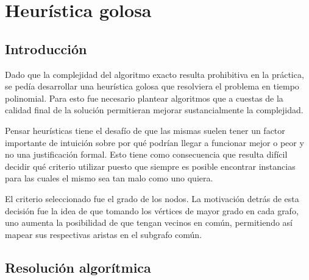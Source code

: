 \section{Heurística golosa}


\subsection{Introducción}

Dado que la complejidad del algoritmo exacto resulta prohibitiva en la práctica,
se pedía desarrollar una heurística golosa que resolviera el problema en tiempo
polinomial. Para esto fue necesario plantear algoritmos que a cuestas de la
calidad final de la solución permitieran mejorar sustancialmente la complejidad.

Pensar heurísticas tiene el desafío de que las mismas suelen tener un factor
importante de intuición sobre por qué podrían llegar a funcionar mejor o peor y
no una justificación formal. Esto tiene como consecuencia que resulta
difícil decidir qué criterio utilizar puesto que siempre es posible
encontrar instancias para las cuales el mismo sea tan malo como uno
quiera.

El criterio seleccionado fue el grado de los nodos. La motivación detrás de esta
decisión fue la idea de que tomando los vértices de mayor grado en cada grafo,
uno aumenta la posibilidad de que tengan vecinos en común, permitiendo así mapear
sus respectivas aristas en el subgrafo común.

\subsection{Resolución algorítmica}

